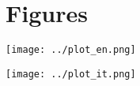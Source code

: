 \documentclass{article}
\renewcommand{\familydefault}{\rmdefault}
\begin{document}
\renewcommand{\familydefault}{\rmdefault}


\fontsize{11}{15}\selectfont{
    
}

\newpage
\section*{Figures}
\begin{center}
    \texttt{[image: ../plot\_en.png]}
    \label{fig 1: english poem}
\end{center}

\begin{center}
    \texttt{[image: ../plot\_it.png]}
    \label{fig 2: italian poem}
\end{center}
\end{document}
